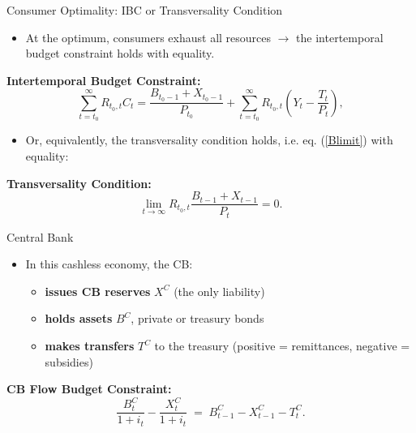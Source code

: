 \documentclass[11pt,aspectratio=169]{beamer}
\begin{document}
\begin{frame}{Consumer Optimality: IBC or Transversality Condition}

\begin{itemize}
    \item At the optimum, consumers exhaust all resources $\longrightarrow$ the intertemporal budget constraint holds with equality.
\end{itemize}

\vspace{0.25cm}
\noindent\textbf{Intertemporal Budget Constraint:}
\begin{equation}
\sum_{t=t_0}^{\infty} R_{t_0,t} C_t =
\frac{B_{t_0-1}+X_{t_0-1}}{P_{t_0}} +
\sum_{t=t_0}^{\infty} R_{t_0,t} \left( Y_t - \frac{T_t}{P_t} \right),
\label{eq: IBCCE}
\end{equation}

\vspace{0.25cm}
\begin{itemize}
    \item Or, equivalently, the transversality condition holds, i.e. eq. (\eqref{Blimit}) with equality:
\end{itemize}
\noindent\textbf{Transversality Condition:}
\begin{equation}
\lim_{t \to \infty} R_{t_0,t} \frac{B_{t-1}+X_{t-1}}{P_t} = 0.
\label{eq: Trans}
\end{equation}

\end{frame}

\begin{frame}{Central Bank}

\begin{itemize}
    \item In this cashless economy, the CB: 
    \vspace{0.25cm}
    \begin{itemize}
        \item \textbf{issues CB reserves} $X^{C}$ (the only liability)
    \vspace{0.25cm}
    \item \textbf{holds assets} $B^{C}$, private or treasury bonds 
    \vspace{0.25cm}
    \item \textbf{makes transfers} $T^{C}$ to the treasury (positive = remittances, negative = subsidies)
    \end{itemize}
\end{itemize}

\vspace{0.5cm}
\noindent\textbf{CB Flow Budget Constraint:}
\begin{equation}
\frac{B_{t}^{C}}{1+i_{t}}-\frac{X_{t}^{C}}{1+i_{t}}  \;=\; B_{t-1}^{C}-X_{t-1}^{C}- T_{t}^{C} .
\label{CBBC1}
\end{equation}

\end{frame}
\end{document}
